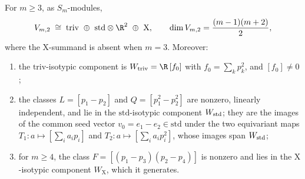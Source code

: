\documentclass[../main.tex]{subfiles}
\begin{document}
\begin{lemma}
\label{lem:sol-frd2-decomposition}
For $m\ge3$, as $S_m$-modules,
\begin{equation}
  V_{m,2}\;\cong\;
  \mathrm{triv}\ \oplus\ \mathrm{std}\otimes\R^2\ \oplus\ \mathrm X,
  \qquad
  \dim V_{m,2}=\frac{(m-1)(m+2)}2,
  \label{eq:sol-frd2-isotypic}
\end{equation}
where the $\mathrm X$-summand is absent when $m=3$.  Moreover:
\begin{enumerate}
\item the $\mathrm{triv}$-isotypic component is
  $W_{\rm triv}=\R\,[f_0]$ with $f_0=\sum_kp_k^2$, and $[f_0]\ne0$;
\item the classes $L=[p_1-p_2]$ and $Q=[p_1^2-p_2^2]$ are nonzero, linearly
  independent, and lie in the $\mathrm{std}$-isotypic component
  $W_{\rm std}$; they are the images of the common seed vector
  $v_0=e_1-e_2\in\mathrm{std}$ under the two equivariant maps
  $T_1:a\mapsto[\textstyle\sum_ia_ip_i]$ and
  $T_2:a\mapsto[\textstyle\sum_ia_ip_i^2]$, whose images span $W_{\rm std}$;
\item for $m\ge4$, the class $F=[(p_1-p_3)(p_2-p_4)]$ is nonzero and lies in the
  $\mathrm X$-isotypic component $W_{\mathrm X}$, which it generates.
\end{enumerate}
\end{lemma}
\end{document}

